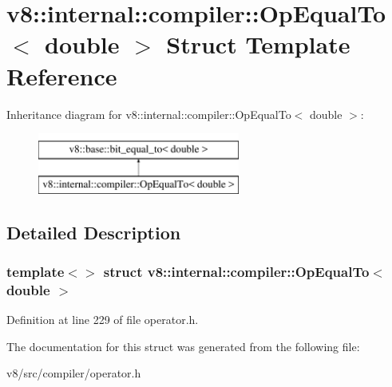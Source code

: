 \hypertarget{structv8_1_1internal_1_1compiler_1_1OpEqualTo_3_01double_01_4}{}\section{v8\+:\+:internal\+:\+:compiler\+:\+:Op\+Equal\+To$<$ double $>$ Struct Template Reference}
\label{structv8_1_1internal_1_1compiler_1_1OpEqualTo_3_01double_01_4}
Inheritance diagram for v8\+:\+:internal\+:\+:compiler\+:\+:Op\+Equal\+To$<$ double $>$\+:\begin{figure}[H]
\begin{center}
\leavevmode
\includegraphics[height=2.000000cm]{structv8_1_1internal_1_1compiler_1_1OpEqualTo_3_01double_01_4}
\end{center}
\end{figure}


\subsection{Detailed Description}
\subsubsection*{template$<$$>$\newline
struct v8\+::internal\+::compiler\+::\+Op\+Equal\+To$<$ double $>$}



Definition at line 229 of file operator.\+h.



The documentation for this struct was generated from the following file\+:\begin{DoxyCompactItemize}
\item 
v8/src/compiler/operator.\+h\end{DoxyCompactItemize}
